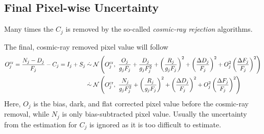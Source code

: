 

\subsection{Final Pixel-wise Uncertainty}
Many times the $ C_j $ is removed by the so-called \emph{cosmic-ray rejection} algorithms. 
\begin{thm}
The final, cosmic-ray removed pixel value will follow
\begin{equation} \label{eq: pix error}
\begin{aligned}
  O_j^\mathrm{cr} = \frac{N_j - D_j}{F_j} - C_j = I_j + S_j 
    &\mathrel{\dot{\sim}} \mathcal{N} 
      \left ( O_j^\mathrm{cr},~ 
        \frac{O_j}{g_jF_j} 
        + \frac{D_j}{g_j F_j^2} 
        + \left (\frac{R_j}{g_j F_j} \right )^2 
        + \left (\frac{\Delta D_j}{F_j} \right )^2 
        + O_j^2 \left (\frac{\Delta F_j}{F_j} \right )^2
        \right ) \\
    &\mathrel{\dot{\sim}} \mathcal{N} 
      \left ( O_j^\mathrm{cr},~ 
        \frac{N_j}{g_jF_j^2} 
        + \left (\frac{R_j}{g_j F_j} \right )^2 
        + \left  (\frac{\Delta D_j}{F_j} \right )^2 
        + O_j^2 \left (\frac{\Delta F_j}{F_j} \right )^2
        \right ) 
\end{aligned}
\end{equation}
Here, $ O_j $ is the bias, dark, and flat corrected pixel value before the cosmic-ray removal, while $ N_j $ is only bias-subtracted pixel value. Usually the uncertainty from the estimation for $ C_j $ is ignored as it is too difficult to estimate. 
\end{thm}

